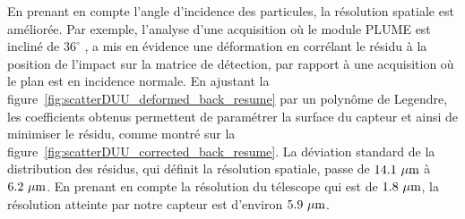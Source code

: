   En prenant en compte l'angle d'incidence des particules, la résolution spatiale est améliorée. 
  Par exemple, l'analyse d'une acquisition où le module PLUME est incliné de $36^{\circ}$ , a mis en évidence une déformation en corrélant le résidu à la position de l'impact sur la matrice de détection, par rapport à une acquisition où le plan est en incidence normale.
  En ajustant la figure~\ref{fig:scatterDUU_deformed_back_resume} par un polynôme de Legendre, les coefficients obtenus permettent de paramétrer la surface du capteur et ainsi de minimiser le résidu, comme montré sur la figure~\ref{fig:scatterDUU_corrected_back_resume}. 
  La déviation standard de la distribution des résidus, qui définit la résolution spatiale, passe de $14.1~\mu\rm{m}$ à $6.2~\mu\rm{m}$.
  En prenant en compte la résolution du télescope qui est de $1.8~\mu\rm{m}$, la résolution atteinte par notre capteur est d'environ $5.9~\mu\rm{m}$. 

